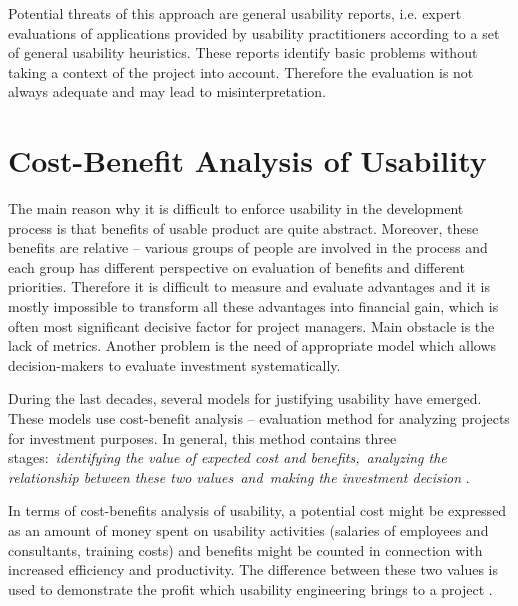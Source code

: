\documentclass[graybox]{svmult}
\begin{document}
Potential threats of this approach are general usability reports, i.e. expert
evaluations of applications provided by usability practitioners according to a
set of general usability heuristics. These reports identify basic problems
without taking a context of the project into account. Therefore the evaluation
is not always adequate and may lead to misinterpretation.

\section{Cost-Benefit Analysis of Usability}
The main reason why it is difficult to enforce usability in the development
process is that benefits of usable product are quite abstract. Moreover, these
benefits are relative -- various groups of people are involved in the process
and each group has different perspective on evaluation of benefits and
different priorities. Therefore it is difficult to measure and evaluate
advantages and it is mostly impossible to transform all these advantages into
financial gain, which is often most significant decisive factor for project
managers. Main obstacle is the lack of metrics. Another problem is the need of
appropriate model which allows decision-makers to evaluate investment
systematically.

During the last decades, several models for justifying usability have emerged.
These models use cost-benefit analysis -- evaluation method for analyzing
projects for investment purposes. In general, this method contains three
stages: \textit{identifying the value of expected cost and benefits, analyzing
the relationship between these two values and making the investment decision}
\cite{burrill1980}.

In terms of cost-benefits analysis of usability, a potential cost might be
expressed as an amount of money spent on usability activities (salaries of
employees and consultants, training costs) and benefits might be counted in
connection with increased efficiency and productivity. The difference between
these two values is used to demonstrate the profit which usability engineering
brings to a project \cite{lund1997another}.
\end{document}
